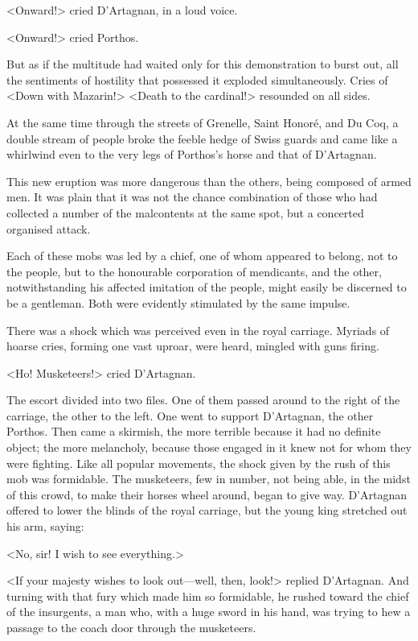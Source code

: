 <Onward!> cried D'Artagnan, in a loud voice.

<Onward!> cried Porthos.

But as if the multitude had waited only for this demonstration to burst out, all the sentiments of hostility that possessed it exploded simultaneously. Cries of <Down with Mazarin!> <Death to the cardinal!> resounded on all sides.

At the same time through the streets of Grenelle, Saint Honoré, and Du Coq, a double stream of people broke the feeble hedge of Swiss guards and came like a whirlwind even to the very legs of Porthos's horse and that of D'Artagnan.

This new eruption was more dangerous than the others, being composed of armed men. It was plain that it was not the chance combination of those who had collected a number of the malcontents at the same spot, but a concerted organised attack.

Each of these mobs was led by a chief, one of whom appeared to belong, not to the people, but to the honourable corporation of mendicants, and the other, notwithstanding his affected imitation of the people, might easily be discerned to be a gentleman. Both were evidently stimulated by the same impulse.

There was a shock which was perceived even in the royal carriage. Myriads of hoarse cries, forming one vast uproar, were heard, mingled with guns firing.

<Ho! Musketeers!> cried D'Artagnan.

The escort divided into two files. One of them passed around to the right of the carriage, the other to the left. One went to support D'Artagnan, the other Porthos. Then came a skirmish, the more terrible because it had no definite object; the more melancholy, because those engaged in it knew not for whom they were fighting. Like all popular movements, the shock given by the rush of this mob was formidable. The musketeers, few in number, not being able, in the midst of this crowd, to make their horses wheel around, began to give way. D'Artagnan offered to lower the blinds of the royal carriage, but the young king stretched out his arm, saying:

<No, sir! I wish to see everything.>

<If your majesty wishes to look out—well, then, look!> replied D'Artagnan. And turning with that fury which made him so formidable, he rushed toward the chief of the insurgents, a man who, with a huge sword in his hand, was trying to hew a passage to the coach door through the musketeers.

